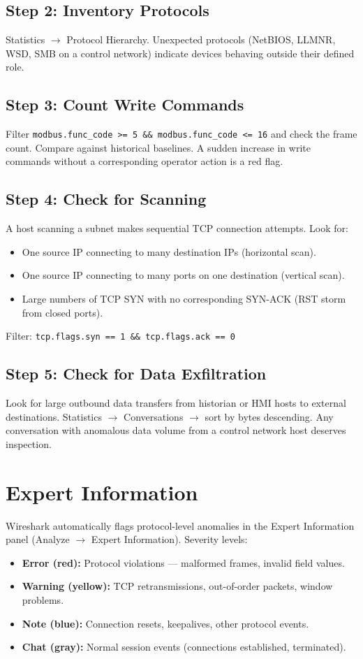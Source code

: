 \documentclass[12pt,twoside,openright]{memoir}
\newcommand{\filter}[1]{\texttt{\color{wsblue}#1}}
\begin{document}
\subsection{Step 2: Inventory Protocols}
Statistics $\to$ Protocol Hierarchy. Unexpected protocols (NetBIOS, LLMNR, WSD, SMB on a control network) indicate devices behaving outside their defined role.

\subsection{Step 3: Count Write Commands}
Filter \filter{modbus.func\_code >= 5 \&\& modbus.func\_code <= 16} and check the frame count. Compare against historical baselines. A sudden increase in write commands without a corresponding operator action is a red flag.

\subsection{Step 4: Check for Scanning}
A host scanning a subnet makes sequential TCP connection attempts. Look for:
\begin{itemize}[noitemsep]
  \item One source IP connecting to many destination IPs (horizontal scan).
  \item One source IP connecting to many ports on one destination (vertical scan).
  \item Large numbers of TCP SYN with no corresponding SYN-ACK (RST storm from closed ports).
\end{itemize}
Filter: \filter{tcp.flags.syn == 1 \&\& tcp.flags.ack == 0}

\subsection{Step 5: Check for Data Exfiltration}
Look for large outbound data transfers from historian or HMI hosts to external destinations. Statistics $\to$ Conversations $\to$ sort by bytes descending. Any conversation with anomalous data volume from a control network host deserves inspection.

\section{Expert Information}

Wireshark automatically flags protocol-level anomalies in the Expert Information panel (Analyze $\to$ Expert Information). Severity levels:
\begin{itemize}[noitemsep]
  \item \textbf{Error (red):} Protocol violations --- malformed frames, invalid field values.
  \item \textbf{Warning (yellow):} TCP retransmissions, out-of-order packets, window problems.
  \item \textbf{Note (blue):} Connection resets, keepalives, other protocol events.
  \item \textbf{Chat (gray):} Normal session events (connections established, terminated).
\end{itemize}
\end{document}
